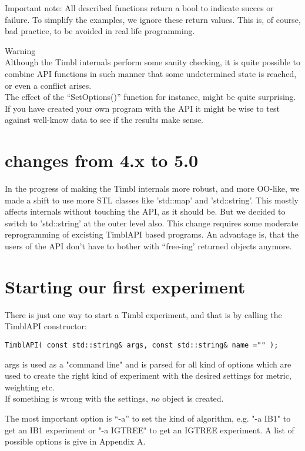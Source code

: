 Important note: All described functions return a bool to indicate
succes or failure. To simplify the examples, we ignore these return
values. This is, of course, bad practice, to be avoided in
real life programming.

{\Large Warning}\\
Although the Timbl internals perform some sanity checking, it is quite
possible to combine API functions in such manner that some
undetermined state is reached, or even a conflict arises. \\
The effect of the ``SetOptions()'' function for instance, might be
quite surprising. \\
If you have created your own program with the API it might be wise to
test against well-know data to see if the results make sense.

\section{changes from 4.x to 5.0}

In the progress of making the Timbl internals more robust, and more
OO-like, we made a shift to use more STL classes like 'std::map' and
'std::string'. This mostly affects internals without touching the API, as
it should be. But we decided to switch to 'std::string' at the outer
level also. This change requires some moderate reprogramming of
excisting TimblAPI based programs. An advantage is, that the users of
the API don't have to bother with ``free-ing' returned objects anymore.

\section{Starting our first experiment}

There is just one way to start a Timbl experiment, and that is by
calling the TimblAPI constructor:

\begin{verbatim}
TimblAPI( const std::string& args, const std::string& name ="" );
\end{verbatim}

args is used as a "command line" and is parsed for all kind of
options which are used to create the right kind of experiment with the
desired settings for metric, weighting etc.\\
If something is wrong with the settings, {\em no} object is created.

The most important option is ``-a''  to set the kind of algorithm,
e.g. "-a IB1" to get an IB1 experiment or "-a IGTREE" to get an IGTREE
experiment. A list of possible options is give in Appendix A.\\

